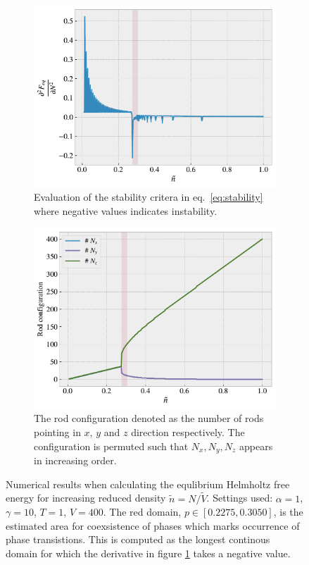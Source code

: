 \documentclass[reprint, amsmath, amssymb, aps, onecolumn]{revtex4-2}
\begin{document}
\begin{figure}[H]
     \hfill
     \centering
     \begin{subfigure}[b]{0.49\textwidth}
         \centering
         \includegraphics[width=\textwidth]{figures/ddFddN.pdf}
         \caption{Evaluation of the stability critera in eq.~\eqref{eq:stability} where negative values indicates instability.}
         \label{fig:ddFddN}
     \end{subfigure}
     \hfill
     \centering
     \begin{subfigure}[b]{0.49\textwidth}
         \centering
         \includegraphics[width=\textwidth]{figures/rod_conf.pdf}
         \caption{The rod configuration denoted as the number of rods pointing in $x$, $y$ and $z$ direction respectively. The configuration is permuted such that $N_x, N_y, N_z$ appears in increasing order.}
         \label{fig:rod_conf}
     \end{subfigure}
     \caption{Numerical results when calculating the equlibrium Helmholtz free energy for increasing reduced density $\tilde{n} = N/\tilde{V}$. Settings used:     $\alpha = 1$, $\gamma = 10$, $T = 1$, $V = 400$. The red domain, $p \in [0.2275, 0.3050]$, is the estimated area for coexsistence of phases which marks occurrence of phase transistions. This is computed as the longest continous domain for which the derivative in figure \ref{fig:ddFddN} takes a negative value.}
     \label{fig:res1}
\end{figure}
\end{document}
